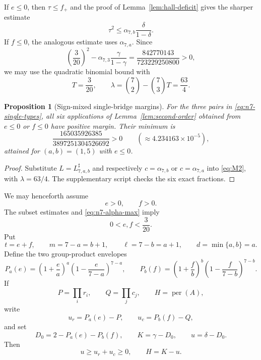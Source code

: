\documentclass[11pt,a4paper]{article}
\numberwithin{equation}{section}
\newtheorem{proposition}[theorem]{Proposition}
\theoremstyle{definition}
\newcommand{\per}{\operatorname{per}}
\newcommand{\1}{\mathbf{1}}
\begin{document}
If $e\le0$, then $\tau\le f_+$ and the proof of
Lemma~\ref{lem:hall-deficit} gives the sharper estimate
\[
 \tau^2\le\alpha_{7,b}\frac{\delta}{1-\delta}.
\]
If $f\le0$, the analogous estimate uses $\alpha_{7,a}$.  Since
\begin{equation}\label{eq:n7-mixed-range}
 \left(\frac3{20}\right)^2
 -\alpha_{7,3}\frac{\gamma}{1-\gamma}
 =\frac{842770143}{723229250800}>0,
\end{equation}
we may use the quadratic binomial bound with
\[
 T=\frac3{20},
 \qquad
 \lambda=\binom72-\binom73T=\frac{63}{4}.
\]

\begin{proposition}[Sign-mixed single-bridge margins]
\label{prop:n7-sign-mixed}
For the three pairs in \eqref{eq:n7-single-types}, all six applications of
Lemma~\ref{lem:second-order} obtained from $e\le0$ or $f\le0$ have positive
margin.  Their minimum is
\begin{equation}\label{eq:n7-mixed-minimum}
 \frac{165035926385}{3897251304526692}>0
 \qquad(\approx4.234163\times10^{-5}),
\end{equation}
attained for $(a,b)=(1,5)$ with $e\le0$.
\end{proposition}

\begin{proof}
Substitute $L=L^{\sharp}_{7,a,b}$ and respectively
$c=\alpha_{7,b}$ or $c=\alpha_{7,a}$ into \eqref{eq:M2}, with
$\lambda=63/4$.  The supplementary script checks the six exact fractions.
\end{proof}

We may henceforth assume
\begin{equation}\label{eq:n7-positive-excesses}
 e>0,
 \qquad
 f>0.
\end{equation}
The subset estimates and \eqref{eq:n7-alpha-max} imply
\begin{equation}\label{eq:n7-ef-box}
 0<e,f<\frac3{20}.
\end{equation}
Put
\[
 t=e+f,
 \qquad
 m=7-a=b+1,
 \qquad
 \ell=7-b=a+1,
 \qquad
 d=\min\{a,b\}=a.
\]
Define the two group-product envelopes
\begin{equation}\label{eq:n7-product-envelopes}
 P_a(e)=\left(1+\frac ea\right)^a
        \left(1-\frac e{7-a}\right)^{7-a},
 \qquad
 P_b(f)=\left(1+\frac fb\right)^b
        \left(1-\frac f{7-b}\right)^{7-b}.
\end{equation}
If
\[
 P=\prod_i r_i,
 \qquad Q=\prod_jc_j,
 \qquad H=\per(A),
\]
write
\[
 u_r=P_a(e)-P,
 \qquad
 u_c=P_b(f)-Q,
\]
and set
\begin{equation}\label{eq:n7-DKu}
 D_0=2-P_a(e)-P_b(f),
 \qquad
 K=\gamma-D_0,
 \qquad
 u=\delta-D_0.
\end{equation}
Then
\begin{equation}\label{eq:n7-u-budget}
 u\ge u_r+u_c\ge0,
 \qquad
 H=K-u.
\end{equation}
\end{document}
